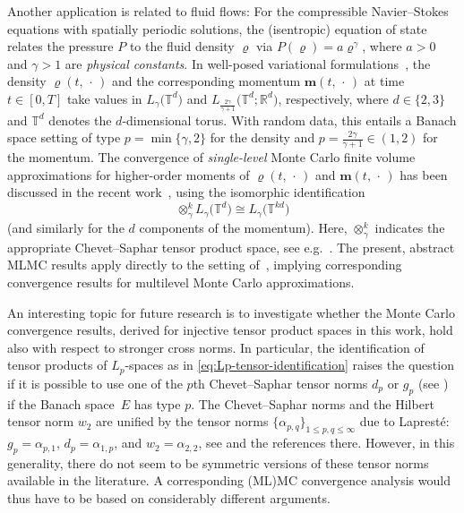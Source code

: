 \documentclass[reqno]{amsart}
\numberwithin{equation}{section}
\newcommand{\bbR}{\mathbb{R}}
\newcommand{\bbT}{\mathbb{T}}
\theoremstyle{remark}
\theoremstyle{definition}
\begin{document}
Another application is related to fluid flows: 
%
For the compressible Navier--Stokes equations
with spatially periodic solutions, 
the (isentropic) equation of state 
relates the pressure $P$ 
to the fluid density $\varrho$ via 
$P(\varrho) = a \varrho^\gamma$\!, 
where $a>0$ and $\gamma>1$ 
are \emph{physical constants}. 
%
In well-posed variational formulations~\cite{LionsVol2}, 
the density $\varrho(t,\,\cdot\,)$ and 
the corresponding momentum $\boldsymbol{m}(t,\,\cdot\,)$ 
at time $t\in[0,T]$ 
take values in 
$L_\gamma\bigl(\bbT^d \bigr)$ and 
$L_{\frac{2\gamma}{\gamma+1}}\bigl(\bbT^d;\bbR^d \bigr)$, 
respectively, 
where $d\in\{2,3\}$ 
and $\bbT^d$ denotes 
the $d$-dimensional torus. 
%
With random data, 
this entails a Banach space setting of type 
$p=\min\{\gamma,2\}$ for the density 
and 
$p=\frac{2\gamma}{\gamma+1} \in (1,2)$ 
for the momentum. 
%
The convergence of \emph{single-level}
Monte Carlo finite volume approximations  
for higher-order moments 
of $\varrho(t,\,\cdot\,)$ 
and $\boldsymbol{m}(t,\,\cdot\,)$ 
has been discussed 
in the recent work~\cite{FereislEtAl22}, 
using the isomorphic identification 
%
\begin{equation}\label{eq:Lp-tensor-identification} 
	\otimes_{\gamma}^k 
	L_\gamma\bigl(\bbT^d\bigr) 
	\cong 
	L_{\gamma}\bigl(\bbT^{kd}\bigr)  
\end{equation}
%
(and similarly for the $d$ components 
of the momentum). 
Here, $\otimes_{\gamma}^k$ indicates   
the appropriate Chevet--Saphar
tensor product space, 
see e.g.\ \cite[Chapter~6]{Ryan2002}. 
The present, abstract MLMC results 
apply directly to the 
setting of~\cite{FereislEtAl22},
implying corresponding convergence results for
multilevel Monte Carlo approximations. 

An interesting topic for future 
research is to investigate 
whether the Monte Carlo 
convergence results, 
derived for injective tensor 
product spaces in this work, 
hold also with respect to stronger 
cross norms.
In particular, the identification of 
tensor products of 
$L_p$-spaces 
as in \eqref{eq:Lp-tensor-identification} 
raises the question if 
it is possible to use 
one of the $p$th 
Chevet--Saphar tensor norms $d_p$ or $g_p$
(see \cite[p.~135]{Ryan2002})
if the Banach space~$E$ has type $p$. 
The Chevet--Saphar norms 
and the Hilbert tensor norm $w_2$ 
are unified by the 
tensor norms $\{\alpha_{p,q}\}_{1\leq p,q\leq \infty}$ 
due to Laprest\'{e}: 
$g_p = \alpha_{p,1}$,
$d_p = \alpha_{1,p}$, 
and 
$w_2 = \alpha_{2,2}$, 
see \cite[Sections 12.5--12.8]{DeFlrtBook} 
and the references there. 
However, in this generality, 
there do not seem to be symmetric versions 
of these tensor norms available in the literature.  
A corresponding (ML)MC convergence analysis 
would thus have to be based on  
considerably different arguments.  
\end{document}
